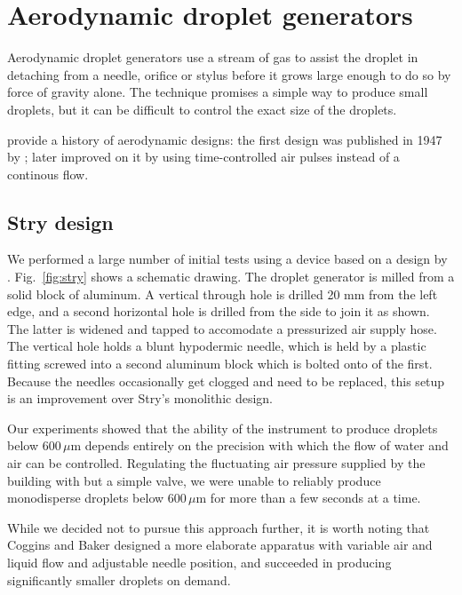 \documentclass[11.5pt,oneside]{book}
\newcommand*{\figref}[1]{Fig.~\ref{#1}}
\begin{document}
\section{Aerodynamic droplet generators}
Aerodynamic droplet generators use a stream of gas to assist the droplet in
detaching from a needle, orifice or stylus before it grows large enough to do so
by force of gravity alone. The technique promises a simple way to produce small
droplets, but it can be difficult to control the exact size of the droplets.

\citet{Allan88} provide a history of aerodynamic designs: the first design was
published in 1947 by \citet{Lane47}; \citet{Reil69} later improved on it by
using time-controlled air pulses instead of a continous flow.
\subsection{Stry design}
We performed a large number of initial tests using a device based on a design by
\citet{Stry92}. \figref{fig:stry} shows a schematic drawing. The droplet
generator is milled from a solid block of aluminum. A vertical through hole
is drilled 20 mm from the left edge, and a second horizontal hole is drilled from the side
to join it as shown. The latter is widened and tapped to accomodate a
pressurized air supply hose. The vertical hole holds a blunt hypodermic needle,
which is held by a plastic fitting screwed into a second aluminum block which is
bolted onto of the first. Because the needles occasionally get clogged and need
to be replaced, this setup is an improvement over Stry's monolithic
design. 

Our experiments showed that the ability of the
instrument to produce droplets below 600$\,\mu$m depends entirely on the
precision with which the flow of water and air can be controlled. Regulating the
fluctuating air pressure supplied by the building with but a simple valve, we
were unable to reliably produce monodisperse droplets below 600$\,\mu$m for more
than a few seconds at a time.

While we decided not to pursue this approach further, it is worth noting that Coggins and Baker
\cite{Coggins83} designed a more elaborate apparatus with variable air and liquid
flow and adjustable needle position, and succeeded in producing significantly
smaller droplets on demand.
\end{document}
